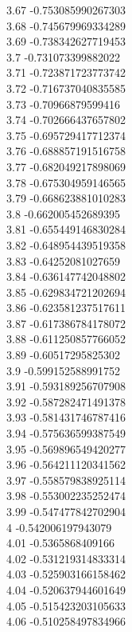 {3.67	-0.753085990267303\\
3.68	-0.745679969334289\\
3.69	-0.738342627719453\\
3.7	-0.731073399882022\\
3.71	-0.723871723773742\\
3.72	-0.716737040835585\\
3.73	-0.70966879599416\\
3.74	-0.702666437657802\\
3.75	-0.695729417712374\\
3.76	-0.688857191516758\\
3.77	-0.682049217898069\\
3.78	-0.675304959146565\\
3.79	-0.668623881010283\\
3.8	-0.662005452689395\\
3.81	-0.655449146830284\\
3.82	-0.648954439519358\\
3.83	-0.64252081027659\\
3.84	-0.636147742048802\\
3.85	-0.629834721202694\\
3.86	-0.623581237517611\\
3.87	-0.617386784178072\\
3.88	-0.611250857766052\\
3.89	-0.60517295825302\\
3.9	-0.599152588991752\\
3.91	-0.593189256707908\\
3.92	-0.587282471491378\\
3.93	-0.581431746787416\\
3.94	-0.575636599387549\\
3.95	-0.569896549420277\\
3.96	-0.564211120341562\\
3.97	-0.558579838925114\\
3.98	-0.553002235252474\\
3.99	-0.547477842702904\\
4	-0.542006197943079\\
4.01	-0.5365868409166\\
4.02	-0.531219314833314\\
4.03	-0.525903166158462\\
4.04	-0.520637944601649\\
4.05	-0.515423203105633\\
4.06	-0.510258497834966\\
}
